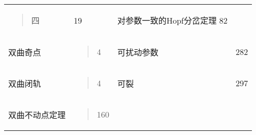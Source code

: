 \documentclass{article}
\begin{document}
\begin{longtable}[]{@{}llll@{}}
\begin{minipage}[t]{0.22\columnwidth}
\begin{quote}
四
\end{quote}\strut
\end{minipage} & \begin{minipage}[t]{0.22\columnwidth}\raggedright
19\strut
\end{minipage} & \begin{minipage}[t]{0.22\columnwidth}\raggedright
对参数一致的Hopf分岔定理 82\strut
\end{minipage} & \begin{minipage}[t]{0.22\columnwidth}\raggedright
\strut
\end{minipage}\tabularnewline
\begin{minipage}[t]{0.22\columnwidth}\raggedright
双曲奇点\strut
\end{minipage} & \begin{minipage}[t]{0.22\columnwidth}\raggedright
\begin{quote}
4
\end{quote}\strut
\end{minipage} & \begin{minipage}[t]{0.22\columnwidth}\raggedright
可扰动参数\strut
\end{minipage} & \begin{minipage}[t]{0.22\columnwidth}\raggedright
282\strut
\end{minipage}\tabularnewline
\begin{minipage}[t]{0.22\columnwidth}\raggedright
双曲闭轨\strut
\end{minipage} & \begin{minipage}[t]{0.22\columnwidth}\raggedright
\begin{quote}
4
\end{quote}\strut
\end{minipage} & \begin{minipage}[t]{0.22\columnwidth}\raggedright
可裂\strut
\end{minipage} & \begin{minipage}[t]{0.22\columnwidth}\raggedright
297\strut
\end{minipage}\tabularnewline
\begin{minipage}[t]{0.22\columnwidth}\raggedright
双曲不动点定理\strut
\end{minipage} & \begin{minipage}[t]{0.22\columnwidth}\raggedright
\begin{quote}
160
\end{quote}\strut
\end{minipage} & \begin{minipage}[t]{0.22\columnwidth}\raggedright

\end{minipage}
\end{longtable}
\end{document}
